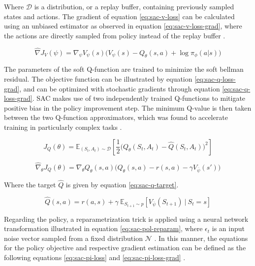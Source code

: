 Where $\mathcal{D}$ is a distribution, or a replay buffer, containing previously sampled states and actions. The gradient of equation \ref{eq:sac-v-loss} can be calculated using an unbiased estimator as observed in equation \ref{eq:sac-v-loss-grad}, where the actions are directly sampled from policy instead of the replay buffer \cite{haarnojaSoftActorCriticOffPolicy2018}.

\begin{equation} \label{eq:sac-v-loss-grad}
\hat{\nabla} J_V(\psi) = \nabla_\psi V_\psi (s) \Big( V_\psi(s) - Q_\theta (s, a) + \log \pi_\phi (a | s) \Big)
\end{equation}

The parameters of the soft Q-function are trained to minimize the soft bellman residual. The objective function can be illustrated by equation \ref{eq:sac-q-loss-grad}, and can be optimized with stochastic gradients through equation \ref{eq:sac-q-loss-grad}. \ac{SAC} makes use of two independently trained Q-functions to mitigate positive bias in the policy improvement step. The minimum Q-value is then taken between the two Q-function approximators, which was found to accelerate training in particularly complex tasks \cite{openaiSpinningDocumentation, haarnojaSoftActorCriticOffPolicy2018}.

\begin{equation} \label{eq:sac-q-loss}
J_Q(\theta) = \mathbb{E}_{(S_t, A_t) \sim \mathcal{D}} \left[ \frac{1}{2} \Big( Q_\theta (S_t, A_t) - \hat{Q}(S_t, A_t) \Big)^2 \right]
\end{equation}

\begin{equation} \label{eq:sac-q-loss-grad}
\hat{\nabla}_\theta J_Q (\theta) = \nabla_\theta Q_\theta (s, a) \Big( Q_\theta (s, a) - r(s, a) - \gamma V_{\overline{\psi}} (s') \Big)
\end{equation}

Where the target $\hat{Q}$ is given by equation \ref{eq:sac-q-target}. \par

\begin{equation} \label{eq:sac-q-target}
\hat{Q} (s, a) = r(a,s) + \gamma\ \mathbb{E}_{S_{t+1} \sim p} [V_{\overline{\psi}} (S_{t+1})\ |\ S_t=s]
\end{equation}

Regarding the policy, a reparametrization trick is applied using a neural network transformation illustrated in equation \ref{eq:sac-pol-reparam}, where $\epsilon_t$ is an input noise vector sampled from a fixed distribution $\mathcal{N}$ \cite{openaiSpinningDocumentation, haarnojaSoftActorCriticOffPolicy2018}. In this manner, the equations for the policy objective and respective gradient estimation can be defined as the following equations \ref{eq:sac-pi-loss} and \ref{eq:sac-pi-loss-grad} \cite{openaiSpinningDocumentation, haarnojaSoftActorCriticOffPolicy2018}.

